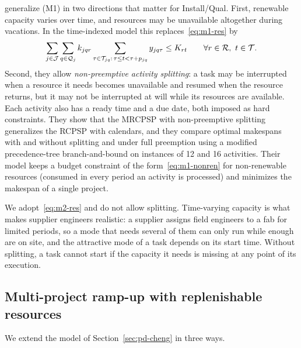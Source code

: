 \citet{cheng2015splitting} generalize (M1) in two directions that matter for
Install/Qual. First, renewable capacity varies over time, and resources may be
unavailable altogether during vacations. In the time-indexed model this
replaces~\eqref{eq:m1-res} by
\begin{equation}\label{eq:m2-res}
    \sum_{j \in \mathcal{J}} \sum_{q \in \mathcal{Q}_j} k_{jqr}
    \sum_{\tau \in \mathcal{T}_{jq} :\, \tau \le t < \tau + p_{jq}} y_{jq\tau} \le K_{rt}
    \qquad \forall r \in \mathcal{R},\ t \in \mathcal{T}.
\end{equation}
Second, they allow \emph{non-preemptive activity splitting}: a task may be
interrupted when a resource it needs becomes unavailable and resumed when the
resource returns, but it may not be interrupted at will while its resources
are available. Each activity also has a ready time and a due date, both
imposed as hard constraints. They show that the MRCPSP with non-preemptive
splitting generalizes the RCPSP with calendars, and they compare optimal
makespans with and without splitting and under full preemption using a
modified precedence-tree branch-and-bound on instances of 12 and 16
activities. Their model keeps a budget constraint of the form~\eqref{eq:m1-nonren}
for non-renewable resources (consumed in every period an activity is
processed) and minimizes the makespan of a single project.

We adopt~\eqref{eq:m2-res} and do not allow splitting. Time-varying capacity
is what makes supplier engineers realistic: a supplier assigns field engineers
to a fab for limited periods, so a mode that needs several of them can only
run while enough are on site, and the attractive mode of a task depends on its
start time. Without splitting, a task cannot start if the capacity it needs is
missing at any point of its execution.

\subsection{Multi-project ramp-up with replenishable resources}\label{sec:pd-ours}

We extend the model of Section~\ref{sec:pd-cheng} in three ways.

